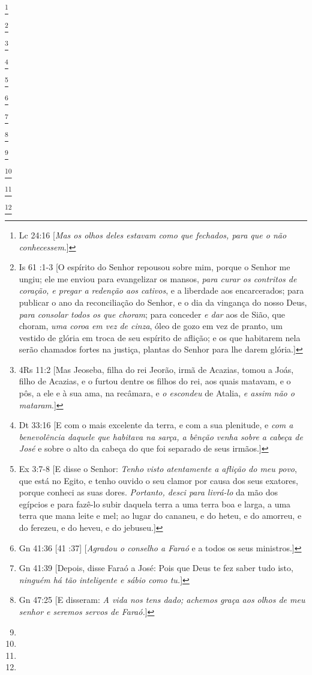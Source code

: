 {{\footnote{Lc 24:16 [\textit{Mas os olhos deles estavam como que fechados, para que o não conhecessem}.]}

\footnote{Is 61 :1-3 [O espírito do Senhor repousou sobre mim, porque o Senhor me ungiu; ele me enviou para evangelizar os mansos, \textit{para curar os contritos de coração, e pregar a redenção aos cativos}, e a liberdade aos encarcerados; para publicar o ano da reconciliação do Senhor, e o dia da vingança do nosso Deus, \textit{para consolar todos os que choram}; para conceder \textit{e dar} aos de Sião, que choram, \textit{uma coroa em vez de cinza}, óleo de gozo em vez de pranto, um vestido de glória em troca de seu espírito de aflição; e os que habitarem nela serão chamados fortes na justiça, plantas do Senhor para lhe darem glória.]}

\footnote{4Rs 11:2 [Mas Jeoseba, filha do rei Jeorão, irmã de Acazias, tomou a Joás, filho de Acazias, e o furtou dentre os filhos do rei, aos quais matavam, e o pôs, a ele e à sua ama, na recâmara, e \textit{o escondeu} de Atalia, \textit{e assim não o mataram}.]}

\footnote{Dt 33:16 [E com o mais excelente da terra, e com a sua plenitude, e \textit{com a benevolência daquele que habitava na sarça, a bênção venha sobre a cabeça de José} e sobre o alto da cabeça do que foi separado de seus irmãos.]}

\footnote{Ex 3:7-8 [E disse o Senhor: \textit{Tenho visto atentamente a aflição do meu povo}, que está no Egito, e tenho ouvido o seu clamor por causa dos seus exatores, porque conheci as suas dores. \textit{Portanto, desci para livrá-lo} da mão dos egípcios e para fazê-lo subir daquela terra a uma terra boa e larga, a uma terra que mana leite e mel; ao lugar do cananeu, e do heteu, e do amorreu, e do ferezeu, e do heveu, e do jebuseu.]}

\footnote{Gn 41:36 [41 :37] [\textit{Agradou o conselho a Faraó} e a todos os seus ministros.]}

 
\footnote{Gn 41:39 [Depois, disse Faraó a José: Pois que Deus te fez saber tudo isto, \textit{ninguém há tão inteligente e sábio como tu.}]}

\footnote{Gn 47:25 [E disseram: \textit{A vida nos tens dado; achemos graça aos olhos de meu senhor e seremos servos de Faraó.}]}

\footnote{}

\footnote{}

\footnote{}

\footnote{}

}}
